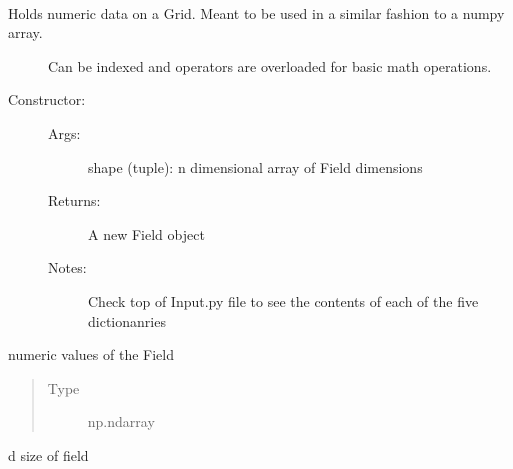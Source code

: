 \documentclass[letterpaper,10pt,english]{sphinxmanual}
\begin{document}
\begin{fulllineitems}
\label{\detokenize{autoapi/Field/index:Field.Field}}~\begin{description}
\item[{Holds numeric data on a Grid. Meant to be used in a similar fashion to a numpy array.}] \leavevmode
\sphinxAtStartPar
Can be indexed and operators are overloaded for basic math operations.

\item[{Constructor:}] \leavevmode\begin{description}
\item[{Args:}] \leavevmode
\sphinxAtStartPar
shape (tuple): n dimensional array of Field dimensions

\item[{Returns:}] \leavevmode
\sphinxAtStartPar
A new Field object

\item[{Notes:}] \leavevmode
\sphinxAtStartPar
Check top of Input.py file to see the contents of each of the five dictionanries

\end{description}

\end{description}

\begin{fulllineitems}
\label{\detokenize{autoapi/Field/index:Field.Field.vals}}
\sphinxAtStartPar
numeric values of the Field
\begin{quote}\begin{description}
\item[{Type}] \leavevmode
\sphinxAtStartPar
np.ndarray

\end{description}\end{quote}

\end{fulllineitems}


\begin{fulllineitems}
\label{\detokenize{autoapi/Field/index:Field.Field.size}}
\sphinxhyphen{}d size of field


\end{fulllineitems}
\end{fulllineitems}
\end{document}
